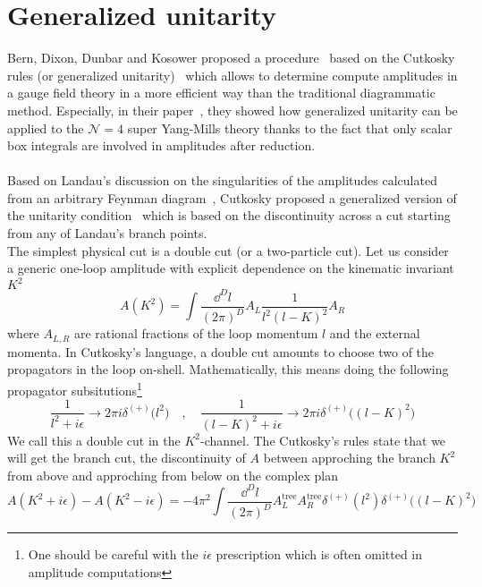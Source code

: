 \section{Generalized unitarity}\label{sect-unitarity}
Bern, Dixon, Dunbar and Kosower proposed a procedure~\cite{Bern:1994zx} based on the Cutkosky rules (or generalized unitarity)~\cite{doi:10.1063/1.1703676} which allows to determine compute amplitudes in a gauge field theory in a more efficient way than the traditional diagrammatic method. 
Especially, in their paper~\cite{Bern:1994zx}, they showed how generalized unitarity can be applied to the $\mathcal{N}=4$ super Yang-Mills theory thanks to the fact that only scalar box integrals are involved in amplitudes after reduction.
\\\\
Based on Landau's discussion on the singularities of the amplitudes calculated from an arbitrary Feynman diagram~\cite{LANDAU1959181}, 
Cutkosky proposed a generalized version of the unitarity condition~\cite{doi:10.1063/1.1703676} which is based on the discontinuity across a cut starting from any of Landau's branch points.
\\
The simplest physical cut is a double cut (or a two-particle cut).
Let us consider a generic one-loop amplitude with explicit dependence on the kinematic invariant $K^2$
\begin{equation}
A(K^2) = \int\frac{\dd^D l}{(2\pi)^D} A_L\frac{1}{l^{2} (l-K)^{2}}A_R
\end{equation}
where $A_{L,R}$ are rational fractions of the loop momentum $l$ and the external momenta. 
In Cutkosky's language, a double cut amounts to choose two of the propagators in the loop on-shell.
Mathematically, this means doing the following propagator subsitutions\footnote{One should be careful with the $i\epsilon$ prescription which is often omitted in amplitude computations}
\begin{equation}\label{on-shell_propagator}
\frac{1}{l^2 + i\epsilon} \rightarrow 2\pi i\delta^{(+)}\big(l^2\big)
\quad,\quad
\frac{1}{(l-K)^2 + i\epsilon} \rightarrow 2\pi i\delta^{(+)}\big((l-K)^2\big)
\end{equation}
We call this a double cut in the $K^2$-channel.
The Cutkosky's rules state that we will get the branch cut, \ie the discontinuity of $A$ between approching the branch $K^2$ from above and approching from below on the complex plan
\begin{equation}\label{cutkosky}
A(K^2 + i\epsilon) - A(K^2 - i\epsilon) =
-4\pi^2 \int\frac{\dd^D l}{(2\pi)^D}A^{\mathrm{tree}}_LA^{\mathrm{tree}}_R \delta^{(+)}(l^2)\delta^{(+)}\big((l-K)^2\big) 
\end{equation}
